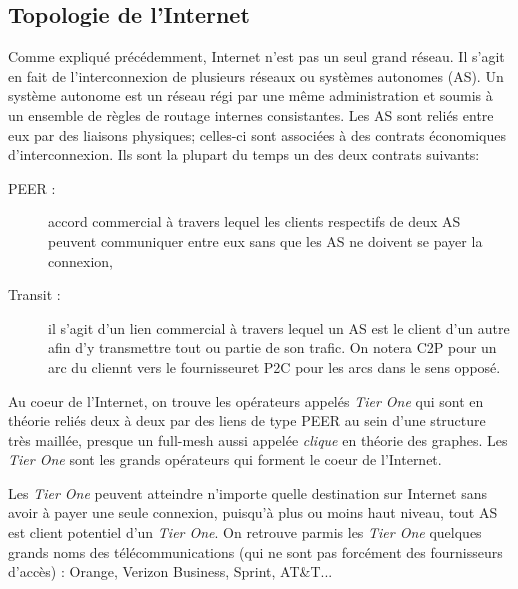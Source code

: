 

%

\subsection{Topologie de l'Internet}
\par
Comme expliqu\'e pr\'ec\'edemment, Internet n'est pas un seul grand r\'eseau. Il s'agit en fait de l'interconnexion de plusieurs r\'eseaux ou syst\`emes autonomes (AS). Un syst\`eme autonome est un r\'eseau r\'egi par une m\^eme administration et soumis \`a un ensemble de r\`egles de routage internes consistantes. Les AS sont reli\'es entre eux par des liaisons physiques; celles-ci sont associ\'ees \`a des contrats \'economiques d'interconnexion. Ils sont la plupart du temps un des deux contrats suivants:
\begin{description}
 \item[PEER : ] accord commercial \`a travers lequel les clients respectifs de deux AS peuvent communiquer entre eux sans que les AS ne doivent se payer la connexion,
 \item[Transit : ] il s'agit d'un lien commercial \`a travers lequel un AS est le client d'un autre afin d'y transmettre tout ou partie de son trafic. On notera C2P pour un arc du cliennt vers le fournisseuret P2C pour les arcs dans le sens oppos\'e.
\end{description}
\par
Au coeur de l'Internet, on trouve les op\'erateurs appel\'es \textit{Tier One} qui sont en th\'eorie reli\'es deux \`a deux par des liens de type PEER au sein d'une structure tr\`es maill\'ee, presque un full-mesh aussi appel\'ee \textit{clique} en th\'eorie des graphes. Les \textit{Tier One} sont les grands op\'erateurs qui forment le coeur de l'Internet.
\par
 Les \textit{Tier One} peuvent atteindre n'importe quelle destination sur Internet sans avoir \`a payer une seule connexion, puisqu'\`a plus ou moins haut niveau, tout AS est client potentiel d'un \textit{Tier One}. On retrouve parmis les \textit{Tier One} quelques grands noms des télécommunications (qui ne sont pas forcément des fournisseurs d'acc\`es) : Orange, Verizon Business, Sprint, AT\&T...

